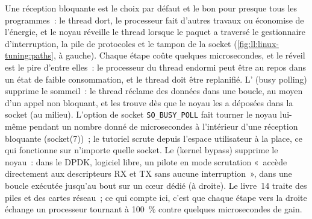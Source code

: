 Une réception bloquante est le choix par défaut et le bon pour presque tous les programmes~: le thread dort, le processeur fait d'autres travaux
ou économise de l'énergie, et le noyau réveille le thread lorsque le paquet a traversé le gestionnaire d'interruption, la pile de protocoles et
le tampon de la socket (\cref{fig:ll:linux-tuning:paths}, à gauche). Chaque étape coûte quelques microsecondes, et le réveil est le pire
d'entre elles~: le processeur du thread endormi peut être au repos dans un état de faible consommation, et le thread doit être replanifié. L' (busy polling)
supprime le sommeil~: le thread réclame des données dans une boucle, au moyen d'un appel non bloquant, et les trouve dès que le noyau les a déposées
dans la socket (au milieu). L'option de socket \texttt{SO\_BUSY\_POLL} fait tourner le noyau lui-même pendant un nombre donné de
microsecondes à l'intérieur d'une réception bloquante (socket(7))~; le tutoriel scrute depuis l'espace utilisateur à la place, ce qui fonctionne sur n'importe quelle socket.
Le  (kernel bypass) supprime le noyau~: dans le DPDK, logiciel libre, un pilote en mode scrutation «~accède directement aux descripteurs RX et TX
sans aucune interruption~», dans une boucle exécutée jusqu'au bout sur un cœur dédié (à droite). Le livre~14 traite des piles et des
cartes réseau~; ce qui compte ici, c'est que chaque étape vers la droite échange un processeur tournant à 100~\% contre quelques microsecondes de gain.


